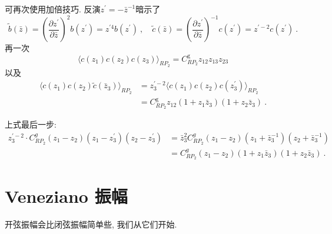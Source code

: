 可再次使用加倍技巧. 反演$z^{\prime}=-\bar{z}^{-1}$暗示了
\begin{equation}
	\tilde{b}(\bar{z})=\left(\frac{\partial z^{\prime}}{\partial \bar{z}}\right)^{2} b(z^{\prime})=z^{\prime 4} b(z^{\prime})\:, \quad 
	\tilde{c}(\bar{z})=\left(\frac{\partial z^{\prime}}{\partial \bar{z}}\right)^{-1} c(z^{\prime})=z^{\prime-2} c(z^{\prime}) \:. 
	\label{6.3.12}
\end{equation}
再一次
\begin{equation}
	\langle c(z_{1}) c(z_{2}) c(z_{3})\rangle_{RP_{2}}=C_{R P_{2}}^{\mathrm{g}} z_{12} z_{13} z_{23} \label{6.3.13}
\end{equation}
以及
\begin{align}
	\langle c(z_{1}) c(z_{2}) \tilde{c}(\bar{z}_{3})\rangle_{R P_{2}} 
	&=z_{3}^{\prime-2} \langle c(z_{1}) c(z_{2}) c(z_{3}^{\prime})\rangle_{R P_{2}} \nonumber \\
	&=C_{R P_{2}}^{\mathrm{g}} z_{12}(1+z_{1} \bar{z}_{3})(1+z_{2} \bar{z}_{3}) \:. \label{6.3.14}
\end{align}
\begin{tcolorbox}
	\begin{remark}
		上式最后一步: 
		\begin{align*}
		 z_{3}^{\prime-2} \cdot C_{R P_{2}}^{g}(z_{1}-z_{2})(z_{1}-z_{3}^{\prime})(z_{2}-z_{3}^{\prime}) 
		&= \bar{z}_{3}^{2} C_{R P_{2}}^{g}(z_{1}-z_{2})(z_{1}+\bar{z}_{3}^{-1})(z_{2}+\bar{z}_{3}^{-1}) \\
		&= C_{R P_{2}}^{g}(z_{1}-z_{2})(1+z_{1} \bar{z}_{3})(1+z_{2} \bar{z}_{3}) \:.
		\end{align*}
	\end{remark}
\end{tcolorbox}


\newpage
\section{Veneziano 振幅}%

开弦振幅会比闭弦振幅简单些, 我们从它们开始.

